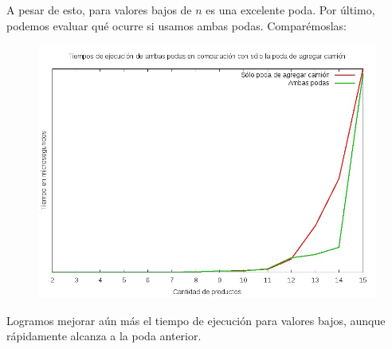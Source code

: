 A pesar de esto, para valores bajos de $n$ es una excelente poda. Por último, podemos evaluar qué ocurre si usamos ambas podas. Comparémoslas:

\begin{figure}[H]
	\begin{minipage}[t]{\linewidth}
		\centering
		\includegraphics[width=\textwidth]{comparacion_poda_camion_con_ambas_podas.jpg}
		\label{fig:p3_comparacion_poda_camion_con_ambas_podas}
	\end{minipage}
\end{figure}

Logramos mejorar aún más el tiempo de ejecución para valores bajos, aunque rápidamente alcanza a la poda anterior.
